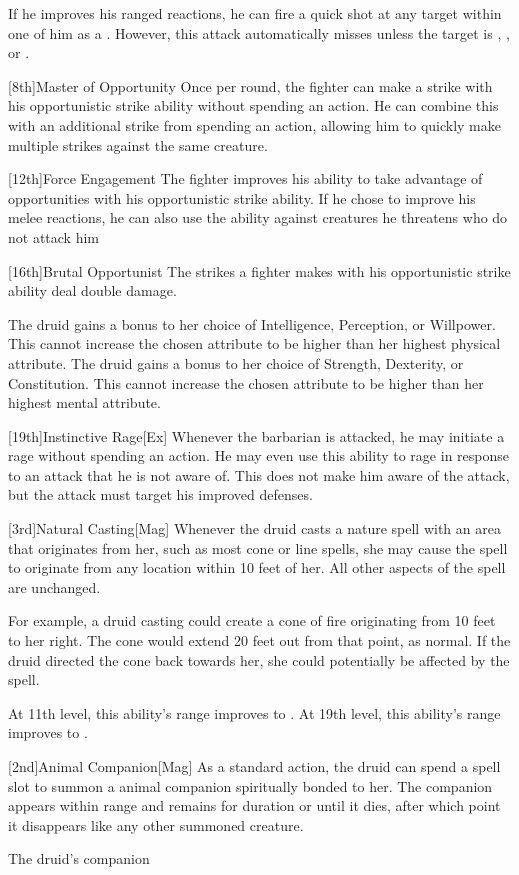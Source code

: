         If he improves his ranged reactions, he can fire a quick shot at any target within one  of him as a .
        However, this attack automatically misses unless the target is , \helpless, or \unaware.

        [8th]{Master of Opportunity}
        Once per round, the fighter can make a strike with his opportunistic strike ability without spending an action.
        He can combine this with an additional strike from spending an action, allowing him to quickly make multiple strikes against the same creature.

        [12th]{Force Engagement}
        The fighter improves his ability to take advantage of opportunities with his opportunistic strike ability.
        If he chose to improve his melee reactions, he can also use the ability against creatures he threatens who do not attack him 

        [16th]{Brutal Opportunist}
        The strikes a fighter makes with his opportunistic strike ability deal double damage.

        The druid gains a  bonus to her choice of Intelligence, Perception, or Willpower.
        This cannot increase the chosen attribute to be higher than her highest physical attribute.
        The druid gains a  bonus to her choice of Strength, Dexterity, or Constitution.
        This cannot increase the chosen attribute to be higher than her highest mental attribute.


        [19th]{Instinctive Rage}[Ex]
        Whenever the barbarian is attacked, he may initiate a rage without spending an action.
        He may even use this ability to rage in response to an attack that he is not aware of.
        This does not make him aware of the attack, but the attack must target his improved defenses.


        [3rd]{Natural Casting}[Mag]
        Whenever the druid casts a nature spell with an area that originates from her, such as most cone or line spells, she may cause the spell to originate from any location within 10 feet of her.
        All other aspects of the spell are unchanged.

        For example, a druid casting  could create a cone of fire originating from 10 feet to her right.
        The cone would extend 20 feet out from that point, as normal.
        If the druid directed the cone back towards her, she could potentially be affected by the spell.

        At 11th level, this ability's range improves to \rngclose.
        At 19th level, this ability's range improves to \rngmed.


        [2nd]{Animal Companion}[Mag]
        As a standard action, the druid can spend a spell slot to summon a animal companion spiritually bonded to her.
        The companion appears within \rngmed range and remains for \durshort duration or until it dies, after which point it disappears like any other summoned creature.

        The druid's companion 
        
